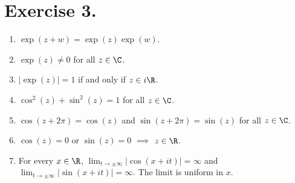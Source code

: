 \section*{Exercise 3.}

\begin{enumerate}[label=(\alph*)]
    \item $\exp(z+w) = \exp(z) \exp(w)$.
    \item $\exp(z) \neq 0$ for all $z\in\C$.
    \item $|\exp(z)| = 1$ if and only if $z\in i\R$.
    \item $\cos^2(z)+\sin^2(z) = 1$ for all $z \in \C$.
    \item $\cos(z+ 2\pi) = \cos(z)$ and $\sin(z+2\pi) = \sin(z)$ for all $z \in \C$.
    \item $\cos(z) = 0$ or $\sin(z) = 0$ $\implies$ $z\in\R$.
    \item For every $x\in\R$, $\lim_{t\to\pm\infty}|\cos(x+it)| = \infty $ and $\lim_{t\to\pm\infty}|\sin(x+it)| = \infty $. The limit is uniform in $x$.
\end{enumerate}